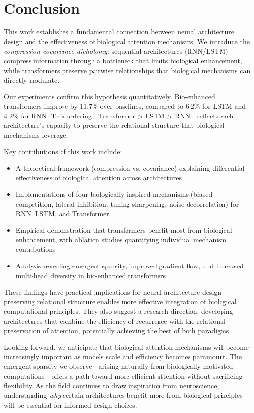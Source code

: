 \section{Conclusion}

This work establishes a fundamental connection between neural architecture design and the effectiveness of biological attention mechanisms. We introduce the \textit{compression-covariance dichotomy}: sequential architectures (RNN/LSTM) compress information through a bottleneck that limits biological enhancement, while transformers preserve pairwise relationships that biological mechanisms can directly modulate.

Our experiments confirm this hypothesis quantitatively. Bio-enhanced transformers improve by 11.7\% over baselines, compared to 6.2\% for LSTM and 4.2\% for RNN. This ordering---Transformer > LSTM > RNN---reflects each architecture's capacity to preserve the relational structure that biological mechanisms leverage.

Key contributions of this work include:
\begin{itemize}
\item A theoretical framework (compression vs. covariance) explaining differential effectiveness of biological attention across architectures
\item Implementations of four biologically-inspired mechanisms (biased competition, lateral inhibition, tuning sharpening, noise decorrelation) for RNN, LSTM, and Transformer
\item Empirical demonstration that transformers benefit most from biological enhancement, with ablation studies quantifying individual mechanism contributions
\item Analysis revealing emergent sparsity, improved gradient flow, and increased multi-head diversity in bio-enhanced transformers
\end{itemize}

These findings have practical implications for neural architecture design: preserving relational structure enables more effective integration of biological computational principles. They also suggest a research direction: developing architectures that combine the efficiency of recurrence with the relational preservation of attention, potentially achieving the best of both paradigms.

Looking forward, we anticipate that biological attention mechanisms will become increasingly important as models scale and efficiency becomes paramount. The emergent sparsity we observe---arising naturally from biologically-motivated computations---offers a path toward more efficient attention without sacrificing flexibility. As the field continues to draw inspiration from neuroscience, understanding \textit{why} certain architectures benefit more from biological principles will be essential for informed design choices.
